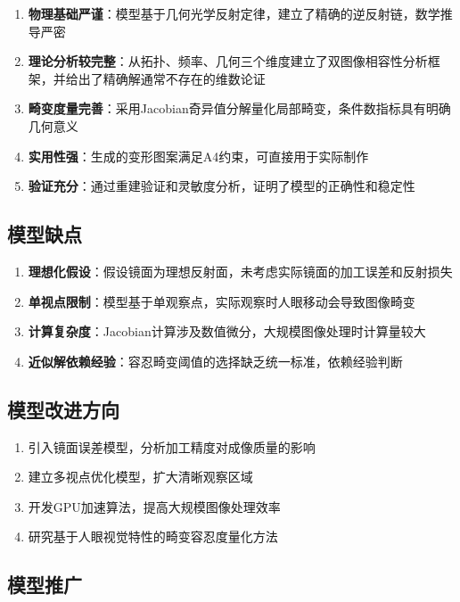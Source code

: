\documentclass[withoutpreface]{cumcmthesis}
\begin{document}
\begin{enumerate}
    \item \textbf{物理基础严谨}：模型基于几何光学反射定律，建立了精确的逆反射链，数学推导严密
    \item \textbf{理论分析较完整}：从拓扑、频率、几何三个维度建立了双图像相容性分析框架，并给出了精确解通常不存在的维数论证
    \item \textbf{畸变度量完善}：采用Jacobian奇异值分解量化局部畸变，条件数指标具有明确几何意义
    \item \textbf{实用性强}：生成的变形图案满足A4约束，可直接用于实际制作
    \item \textbf{验证充分}：通过重建验证和灵敏度分析，证明了模型的正确性和稳定性
\end{enumerate}

\subsection{模型缺点}

\begin{enumerate}
    \item \textbf{理想化假设}：假设镜面为理想反射面，未考虑实际镜面的加工误差和反射损失
    \item \textbf{单视点限制}：模型基于单观察点，实际观察时人眼移动会导致图像畸变
    \item \textbf{计算复杂度}：Jacobian计算涉及数值微分，大规模图像处理时计算量较大
    \item \textbf{近似解依赖经验}：容忍畸变阈值的选择缺乏统一标准，依赖经验判断
\end{enumerate}

\subsection{模型改进方向}

\begin{enumerate}
    \item 引入镜面误差模型，分析加工精度对成像质量的影响
    \item 建立多视点优化模型，扩大清晰观察区域
    \item 开发GPU加速算法，提高大规模图像处理效率
    \item 研究基于人眼视觉特性的畸变容忍度量化方法
\end{enumerate}

\subsection{模型推广}
\end{document}
